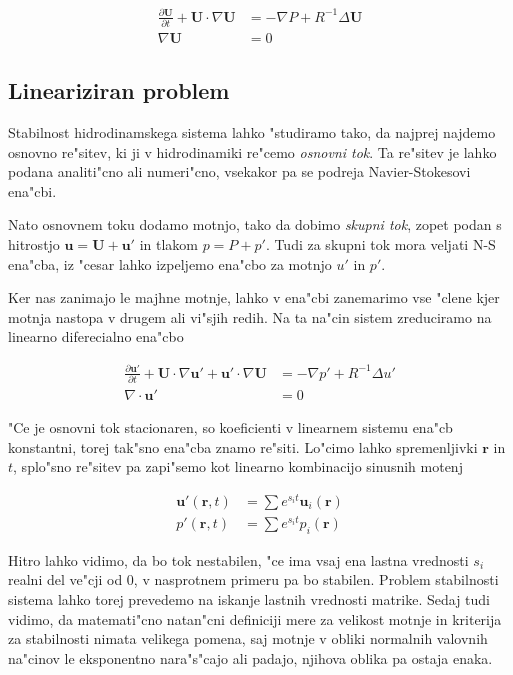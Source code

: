 \documentclass[a4paper,10pt]{article}
\renewcommand{\vec}{\mathbf}
\newcommand{\rt}{(\vec r, t)}
\begin{document}
\begin{align}
 \label{eq:ns-brezdim}
\frac{\partial \vec U}{\partial t} + \vec U \cdot \nabla \vec U &= -\nabla P + R^{-1} \Delta \vec U \\
\nabla \vec U &= 0
\end{align}

\subsection{Lineariziran problem}

Stabilnost hidrodinamskega sistema lahko "studiramo tako, da najprej najdemo osnovno re"sitev, ki ji v hidrodinamiki re"cemo \emph{osnovni tok}. Ta re"sitev je lahko podana analiti"cno ali numeri"cno, vsekakor pa se podreja Navier-Stokesovi ena"cbi. 

Nato osnovnem toku dodamo motnjo, tako da dobimo \emph{skupni tok}, zopet podan s hitrostjo $\vec u = \vec U + \vec u'$ in tlakom $p = P + p'$. Tudi za skupni tok mora veljati N-S ena"cba, iz "cesar lahko izpeljemo ena"cbo za motnjo $u'$ in $p'$. 

Ker nas zanimajo le majhne motnje, lahko v ena"cbi zanemarimo vse "clene kjer motnja nastopa v drugem ali vi"sjih redih. Na ta na"cin sistem zreduciramo na linearno diferecialno ena"cbo 

\begin{align}
 \label{eq:ns-linearna}
\frac{\partial \vec u'}{\partial t} + \vec U \cdot \nabla \vec u' + \vec u' \cdot \nabla \vec U &= -\nabla p' + R^{-1}\Delta u' \\
\label{eq:nestisljivost-linearna}
\nabla \cdot \vec u' &= 0
\end{align}

"Ce je osnovni tok stacionaren, so koeficienti v linearnem sistemu ena"cb konstantni, torej tak"sno ena"cba znamo re"siti. Lo"cimo lahko spremenljivki $\vec r$ in $t$, splo"sno re"sitev pa zapi"semo kot linearno kombinacijo sinusnih motenj

\begin{align}
 \vec u'\rt &= \sum e^{s_i t} \vec u_i(\vec r) \\
 p'\rt &= \sum e^{s_i t} p_i(\vec r)
\end{align}

Hitro lahko vidimo, da bo tok nestabilen, "ce ima vsaj ena lastna vrednosti $s_i$ realni del ve"cji od 0, v nasprotnem primeru pa bo stabilen. Problem stabilnosti sistema lahko torej prevedemo na iskanje lastnih vrednosti matrike. Sedaj tudi vidimo, da matemati"cno natan"cni definiciji mere za velikost motnje in kriterija za stabilnosti nimata velikega pomena, saj motnje v obliki normalnih valovnih na"cinov le eksponentno nara"s"cajo ali padajo, njihova oblika pa ostaja enaka. 
\end{document}
